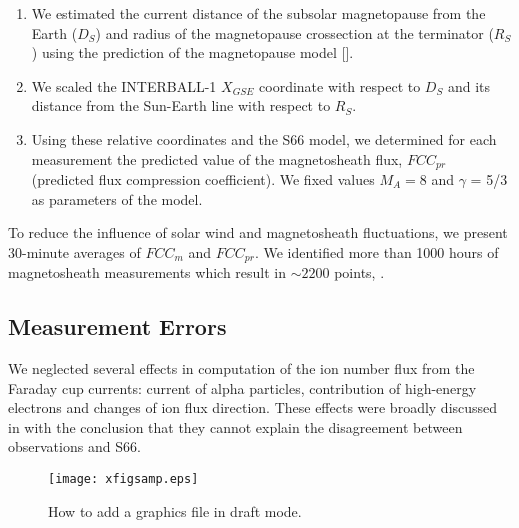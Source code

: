 \documentclass[jgrga]{agu2001}
\begin{document}
\begin{article}
\begin{enumerate}
\item We estimated the current distance of the subsolar magnetopause
from the Earth ($D_S$) and radius of the magnetopause crossection at
the terminator ($R_S$) using the prediction of the magnetopause
model [].

\item We scaled the INTERBALL-1 $X_{GSE}$ coordinate with respect to
$D_S$ and its distance from the Sun-Earth line with respect to
$R_S$.

\item Using these relative coordinates and the S66 model, we determined for
each measurement the predicted value of the magnetosheath
flux, $FCC_{pr}$ (predicted flux compression coefficient). We fixed
values $M_A = 8$ and $\gamma$ = 5/3 as parameters of the model.
\end{enumerate}

To reduce the influence of solar wind and magnetosheath fluctuations,
we present 30-minute averages of $FCC_m$ and $FCC_{pr}$. We
identified more than 1000 hours of magnetosheath measurements
which result in $\sim 2200$ points, .



\subsection{Measurement Errors}
We neglected several effects in computation of the
ion number flux from the Faraday cup currents: current
of alpha particles, contribution of high-energy electrons and
changes of ion flux direction. These effects were broadly
discussed in  with the
conclusion that they cannot explain the disagreement
between observations and S66.


\begin{figure}[t]%
\noindent\texttt{[image: xfigsamp.eps]}
\caption{How to add a graphics file in draft mode.}
\label{figfour}
\end{figure}



\end{article}
\end{document}

